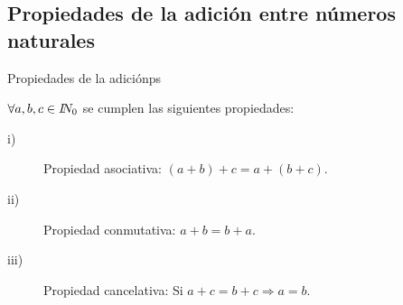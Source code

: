 \subsection{Propiedades de la adición entre números naturales}

\begin{teo}{Propiedades de la adición}{ps}

$\forall a,b,c\in\na_{0}$ se cumplen las siguientes propiedades:
\begin{description}
\item [{i)}] Propiedad asociativa: $\left(a+b\right)+c=a+\left(b+c\right).$
\item [{ii)}] Propiedad conmutativa: $a+b=b+a$. 
\item [{iii)}] Propiedad cancelativa: Si $a+c=b+c\Rightarrow a=b.$
\end{description}
\end{teo}
